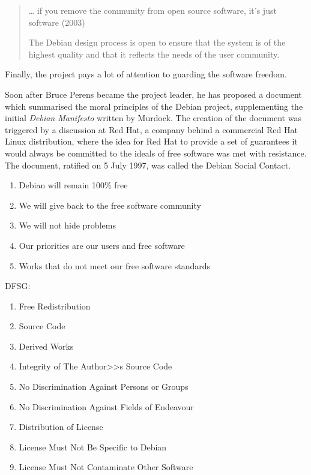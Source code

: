 \documentclass[10pt, a5paper]{article}
\begin{document}
\begin{quotation}

\ldots{} if you remove the community from open source software, it's just software (2003)

The Debian design process is open to ensure that the system is of the highest quality and that it reflects the needs of the user community.

\end{quotation}

Finally, the project pays a lot of attention to guarding the software freedom.

Soon after Bruce Perens became the project leader, he has proposed a document which summarised the moral principles of the Debian project, supplementing the initial \emph{Debian Manifesto} written by Murdock. The creation of the document was triggered by a discussion at Red Hat, a company behind a commercial Red Hat Linux distribution, where the idea for Red Hat to provide a set of guarantees it would always be committed to the ideals of free software was met with resistance. The document, ratified on 5 July 1997, was called the Debian Social Contact.

\begin{enumerate}
  \item Debian will remain 100\% free
  \item We will give back to the free software community
  \item We will not hide problems
  \item Our priorities are our users and free software
  \item Works that do not meet our free software standards
\end{enumerate}

DFSG:

\begin{enumerate}
  \item Free Redistribution
  \item Source Code
  \item Derived Works
  \item Integrity of The Author>>s Source Code
  \item No Discrimination Against Persons or Groups
  \item No Discrimination Against Fields of Endeavour
  \item Distribution of License
  \item License Must Not Be Specific to Debian
  \item License Must Not Contaminate Other Software
\end{enumerate}
\end{document}
